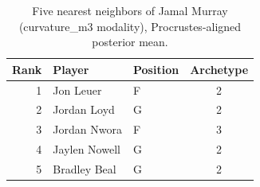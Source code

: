 \begin{table}[htbp]
  \centering\small
  \begin{tabular}{rllc}
    \toprule
    Rank & Player & Position & Archetype \\
    \midrule
    1 & Jon Leuer & F & 2 \\
    2 & Jordan Loyd & G & 2 \\
    3 & Jordan Nwora & F & 3 \\
    4 & Jaylen Nowell & G & 2 \\
    5 & Bradley Beal & G & 2 \\
    \bottomrule
  \end{tabular}
  \caption{Five nearest neighbors of Jamal Murray (curvature_m3 modality), Procrustes-aligned posterior mean.}
  \label{tab:Jamal_Murray_neighbors_curvature_m3}
\end{table}

